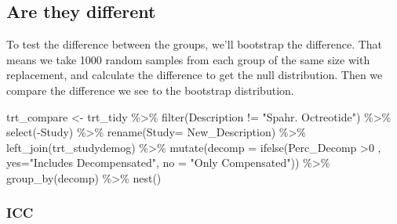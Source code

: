 \documentclass[
]{article}
\newenvironment{Shaded}{\begin{snugshade}}{\end{snugshade}}
\newcommand{\AttributeTok}[1]{\textcolor[rgb]{0.77,0.63,0.00}{#1}}
\newcommand{\DecValTok}[1]{\textcolor[rgb]{0.00,0.00,0.81}{#1}}
\newcommand{\FunctionTok}[1]{\textcolor[rgb]{0.00,0.00,0.00}{#1}}
\newcommand{\NormalTok}[1]{#1}
\newcommand{\OtherTok}[1]{\textcolor[rgb]{0.56,0.35,0.01}{#1}}
\newcommand{\SpecialCharTok}[1]{\textcolor[rgb]{0.00,0.00,0.00}{#1}}
\newcommand{\StringTok}[1]{\textcolor[rgb]{0.31,0.60,0.02}{#1}}
\begin{document}
\hypertarget{are-they-different}{%
\subsection{Are they different}\label{are-they-different}}

To test the difference between the groups, we'll bootstrap the
difference. That means we take 1000 random samples from each group of
the same size with replacement, and calculate the difference to get the
null distribution. Then we compare the difference we see to the
bootstrap distribution.

\begin{Shaded}
\begin{Highlighting}[]
\NormalTok{trt\_compare }\OtherTok{\textless{}{-}}\NormalTok{ trt\_tidy }\SpecialCharTok{\%\textgreater{}\%} 
  \FunctionTok{filter}\NormalTok{(Description }\SpecialCharTok{!=} \StringTok{"Spahr. Octreotide"}\NormalTok{) }\SpecialCharTok{\%\textgreater{}\%}
  \FunctionTok{select}\NormalTok{(}\SpecialCharTok{{-}}\NormalTok{Study) }\SpecialCharTok{\%\textgreater{}\%}
  \FunctionTok{rename}\NormalTok{(}\AttributeTok{Study=}\NormalTok{ New\_Description) }\SpecialCharTok{\%\textgreater{}\%} 
  \FunctionTok{left\_join}\NormalTok{(trt\_studydemog) }\SpecialCharTok{\%\textgreater{}\%} 
  \FunctionTok{mutate}\NormalTok{(}\AttributeTok{decomp =} \FunctionTok{ifelse}\NormalTok{(Perc\_Decomp }\SpecialCharTok{\textgreater{}}\DecValTok{0}\NormalTok{ , }
                           \AttributeTok{yes=}\StringTok{"Includes Decompensated"}\NormalTok{,}
                           \AttributeTok{no =} \StringTok{"Only Compensated"}\NormalTok{)) }\SpecialCharTok{\%\textgreater{}\%}
  \FunctionTok{group\_by}\NormalTok{(decomp) }\SpecialCharTok{\%\textgreater{}\%} 
  \FunctionTok{nest}\NormalTok{()}
\end{Highlighting}
\end{Shaded}

\hypertarget{icc-1}{%
\subsubsection{ICC}\label{icc-1}}
\end{document}
